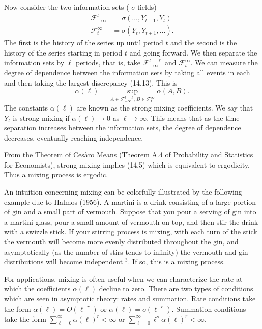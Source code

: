 \documentclass[10pt]{article}
\begin{document}
Now consider the two information sets ( $\sigma$-fields)
$$
\begin{aligned}
\mathscr{F}_{-\infty}^{t} &=\sigma\left(\ldots, Y_{t-1}, Y_{t}\right) \\
\mathscr{F}_{t}^{\infty} &=\sigma\left(Y_{t}, Y_{t+1}, \ldots\right) .
\end{aligned}
$$
The first is the history of the series up until period $t$ and the second is the history of the series starting in period $t$ and going forward. We then separate the information sets by $\ell$ periods, that is, take $\mathscr{F}_{-\infty}^{t-\ell}$ and $\mathscr{F}_{t}^{\infty}$. We can measure the degree of dependence between the information sets by taking all events in each and then taking the largest discrepancy (14.13). This is
$$
\alpha(\ell)=\sup _{A \in \mathscr{F}_{-\infty}^{t-\ell}, B \in \mathscr{F}_{t}^{\infty}} \alpha(A, B) .
$$
The constants $\alpha(\ell)$ are known as the strong mixing coefficients. We say that $Y_{t}$ is strong mixing if $\alpha(\ell) \rightarrow 0$ as $\ell \rightarrow \infty$. This means that as the time separation increases between the information sets, the degree of dependence decreases, eventually reaching independence.

From the Theorem of Cesàro Means (Theorem A.4 of Probability and Statistics for Economists), strong mixing implies (14.5) which is equivalent to ergodicity. Thus a mixing process is ergodic.

An intuition concerning mixing can be colorfully illustrated by the following example due to Halmos (1956). A martini is a drink consisting of a large portion of gin and a small part of vermouth. Suppose that you pour a serving of gin into a martini glass, pour a small amount of vermouth on top, and then stir the drink with a swizzle stick. If your stirring process is mixing, with each turn of the stick the vermouth will become more evenly distributed throughout the gin, and asymptotically (as the number of stirs tends to infinity) the vermouth and gin distributions will become independent ${ }^{3}$. If so, this is a mixing process.

For applications, mixing is often useful when we can characterize the rate at which the coefficients $\alpha(\ell)$ decline to zero. There are two types of conditions which are seen in asymptotic theory: rates and summation. Rate conditions take the form $\alpha(\ell)=O\left(\ell^{-r}\right)$ or $\alpha(\ell)=o\left(\ell^{-r}\right)$. Summation conditions take the form $\sum_{\ell=0}^{\infty} \alpha(\ell)^{r}<\infty$ or $\sum_{\ell=0}^{\infty} \ell^{s} \alpha(\ell)^{r}<\infty$.
\end{document}
